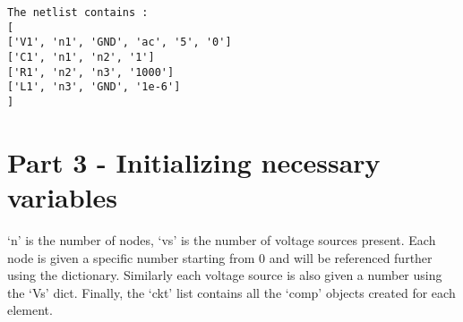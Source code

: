 \documentclass[11pt]{article}
\begin{document}
	

	

    \begin{Verbatim}[commandchars=\\\{\}]
The netlist contains :
[
['V1', 'n1', 'GND', 'ac', '5', '0']
['C1', 'n1', 'n2', '1']
['R1', 'n2', 'n3', '1000']
['L1', 'n3', 'GND', '1e-6']
]

    \end{Verbatim}

	
		
    \hypertarget{part-3---initializing-necessary-variables}{%
\section{Part 3 - Initializing necessary
variables}\label{part-3---initializing-necessary-variables}}

`n' is the number of nodes, `vs' is the number of voltage sources
present. Each node is given a specific number starting from 0 and will
be referenced further using the dictionary. Similarly each voltage
source is also given a number using the `Vs' dict. Finally, the `ckt'
list contains all the `comp' objects created for each element.

	

	
		
	
	
		
			
		
	
		
			
		
	
		
			
		
	
		
			
		
	
		
			
		
	
		
			
		
	
		
			
		
	
		
			
		
	
		
			
		
	
		
			
		
	
		
			
		
	
		
			
		
	
\end{document}
